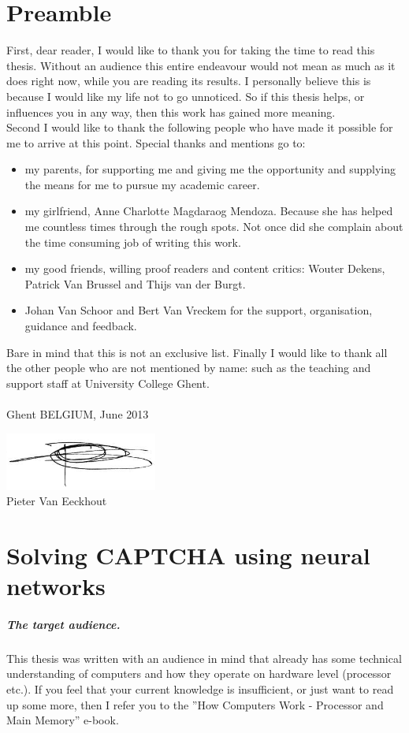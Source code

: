 \documentclass[pdftex,a4paper,12pt,twoside]{report}
\newcommand{\captchasp}{CAPTCHA }
\newcommand{\studenta}{Pieter {Van Eeckhout}}
\newcommand{\titel}{Solving \captchasp using neural networks}
\begin{document}
\chapter*{Preamble}
\label{ch:preamble}
First, dear reader, I would like to thank you for taking the time to read this thesis. Without an audience this entire endeavour would not mean as much as it does right now, while you are reading its results. I personally believe this is because I would like my life not to go unnoticed. So if this thesis helps, or influences you in any way, then this work has gained more meaning.\\Second I would like to thank the following people who have made it possible for me to arrive at this point. Special thanks and mentions go to:
\begin{itemize}
\item my parents, for supporting me and giving me the opportunity and supplying the means for me to pursue my academic career.
\item my girlfriend, Anne Charlotte Magdaraog Mendoza. Because she has helped me countless times through the rough spots. Not once did she complain about the time consuming job of writing this work.
\item my good friends, willing proof readers and content critics: Wouter Dekens, Patrick Van Brussel and Thijs van der Burgt.
\item Johan Van Schoor and Bert Van Vreckem for the support, organisation, guidance and feedback.
\end{itemize}
Bare in mind that this is not an exclusive list. Finally I would like to thank all the other people who are not mentioned by name: such as the teaching and support staff at University College Ghent.\\\\Ghent BELGIUM, June 2013
\begin{center}
\includegraphics[width=5cm]{./img/signature.png}\\[.5cm]
\studenta
\end{center}
\chapter{\titel}
\label{ch:introduction}
\paragraph{The target audience.}
This thesis was written with an audience in mind that already has some technical understanding of computers and how they operate on hardware level (processor etc.). If you feel that your current knowledge is insufficient, or just want to read up some more, then I refer you to the ''How Computers Work - Processor and Main Memory'' \citep{Young2001} e-book.
\end{document}
